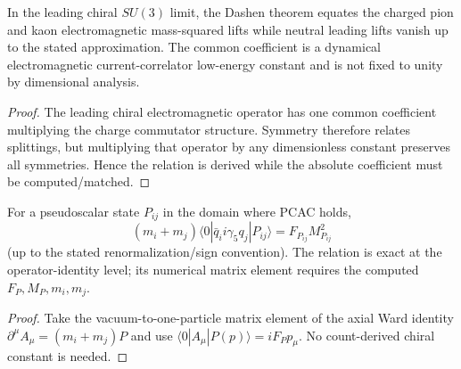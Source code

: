 \documentclass[12pt,a4paper]{article}
\begin{document}
\begin{corollary}
\label{p11:cor:universal-dashen-lift-native}

In the leading chiral \(SU(3)\) limit, the Dashen theorem equates the charged pion and kaon electromagnetic mass-squared lifts while neutral leading lifts vanish up to the stated approximation.  The common coefficient is a dynamical electromagnetic current-correlator low-energy constant and is not fixed to unity by dimensional analysis.
\label{p11:eq:universal-dashen-lift-native}
\label{p11:eq:dashen-native-relations}
\end{corollary}
\begin{proof}

The leading chiral electromagnetic operator has one common coefficient multiplying the charge commutator structure.  Symmetry therefore relates splittings, but multiplying that operator by any dimensionless constant preserves all symmetries.  Hence the relation is derived while the absolute coefficient must be computed/matched.
\end{proof}

\begin{corollary}
\label{p11:cor:pcac-pseudoscalar-density-native}

For a pseudoscalar state \(P_{ij}\) in the domain where PCAC holds,
\[
(m_i+m_j)\langle0|\bar q_i i\gamma_5q_j|P_{ij}\rangle=F_{P_{ij}}M_{P_{ij}}^2
\]
(up to the stated renormalization/sign convention).  The relation is exact at the operator-identity level; its numerical matrix element requires the computed \(F_P,M_P,m_i,m_j\).
\label{p11:eq:pcac-density-native}
\label{p11:eq:pseudoscalar-density-universal-native}
\end{corollary}
\begin{proof}

Take the vacuum-to-one-particle matrix element of the axial Ward identity \(\partial^\mu A_\mu=(m_i+m_j)P\) and use \(\langle0|A_\mu|P(p)\rangle=iF_Pp_\mu\).  No count-derived chiral constant is needed.
\end{proof}
\end{document}
